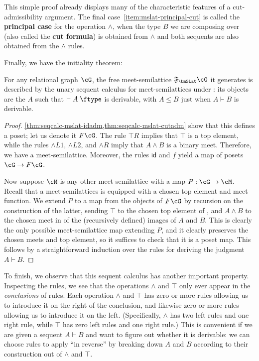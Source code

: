 \documentclass{book}
\let\types\vdash
\def\idfunc{\mathsf{id}}
\def\type{\;\ftype}
\newcommand{\F}[1]{\mathfrak{F}_{#1}}
\let\meet\wedge
\def\meetL{\mathord{\meet}L}
\def\meetR{\mathord{\meet}R}
\begin{document}
This simple proof already displays many of the characteristic features of a cut-admissibility argument.
The final case~\ref{item:mslat-principal-cut} is called the \textbf{principal case} for the operation $\meet$, when the type $B$ we are composing over (also called the \textbf{cut formula}) is obtained from $\meet$ and both sequents are also obtained from the $\meet$ rules.

Finally, we have the initiality theorem:

\begin{thm}\label{thm:seqcalc-mslat-initial}
  For any relational graph $\cG$, the free meet-semilattice $\F\bmSLat \cG$ it generates is described by the unary sequent calculus for meet-semilattices under \cG: its objects are the $A$ such that $\types A\type$ is derivable, with $A\le B$ just when $A\types B$ is derivable.
\end{thm}
\begin{proof}
  \cref{thm:seqcalc-mslat-idadm,thm:seqcalc-mslat-cutadm} show that this defines a poset; let us denote it $F\cG$.
  The rule $\top R$ implies that $\top$ is a top element, while the rules $\meetL1$, $\meetL2$, and $\meetR$ imply that $A\meet B$ is a binary meet.
  Therefore, we have a meet-semilattice.
  Moreover, the rules $\idfunc$ and $f$ yield a map of posets $\cG\to F\cG$.

  Now suppose $\cM$ is any other meet-semilattice with a map $P:\cG\to\cM$.
  Recall that a meet-semilattices is equipped with a chosen top element and meet function.
  We extend $P$ to a map from the objects of $F\cG$ by recursion on the construction of the latter, sending $\top$ to the chosen top element of \cM, and $A\meet B$ to the chosen meet in \cM of the (recursively defined) images of $A$ and $B$.
  This is clearly the only possible meet-semilattice map extending $P$, and it clearly preserves the chosen meets and top element, so it suffices to check that it is a poset map.
  This follows by a straightforward induction over the rules for deriving the judgment $A\types B$.
\end{proof}

To finish, we observe that this sequent calculus has another important property.
Inspecting the rules, we see that the operations $\meet$ and $\top$ only ever appear in the \emph{conclusions} of rules.
Each operation $\meet$ and $\top$ has zero or more rules allowing us to introduce it on the right of the conclusion, and likewise zero or more rules allowing us to introduce it on the left.
(Specifically, $\meet$ has two left rules and one right rule, while $\top$ has zero left rules and one right rule.)
This is convenient if we are given a sequent $A\types B$ and want to figure out whether it is derivable: we can choose rules to apply ``in reverse'' by breaking down $A$ and $B$ according to their construction out of $\meet$ and $\top$.
\end{document}
